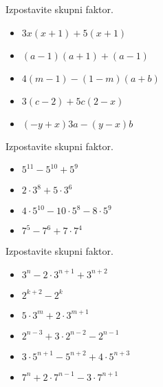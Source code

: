\begin{multicols}{2}
    
        
            \begin{naloga}
                Izpostavite skupni faktor.
                \begin{itemize}
                    \item $3x(x+1)+5(x+1)$ 
                    \item $(a-1)(a+1)+(a-1)$ 
                    \item $4(m-1)-(1-m)(a+b)$ 
                    \item $3(c-2)+5c(2-x)$ 
                    \item $(-y+x)3a-(y-x)b$ 
                \end{itemize}
            \end{naloga}
        
    
        
            \begin{naloga}
                Izpostavite skupni faktor.
                \begin{itemize}
                    \item $5^{11}-5^{10}+5^9$ 
                    \item $2\cdot 3^8+5\cdot 3^6$ 
                    \item $4\cdot 5^{10}-10\cdot 5^8-8\cdot 5^9$ 
                    \item $7^5-7^6+7\cdot 7^4$ 
                \end{itemize}
            \end{naloga}
        
    
        
            \begin{naloga}
                Izpostavite skupni faktor.
                \begin{itemize}
                    \item $3^n-2\cdot 3^{n+1}+3^{n+2}$ 
                    \item $2^{k+2}-2^k$ 
                    \item $5\cdot 3^m+2\cdot 3^{m+1}$ 
                    \item $2^{n-3}+3\cdot 2^{n-2}-2^{n-1}$ 
                    \item $3\cdot 5^{n+1}-5^{n+2}+4\cdot 5^{n+3}$ 
                    \item $7^n+2\cdot 7^{n-1}-3\cdot 7^{n+1}$ 
                \end{itemize}
            \end{naloga}
        

\end{multicols}
